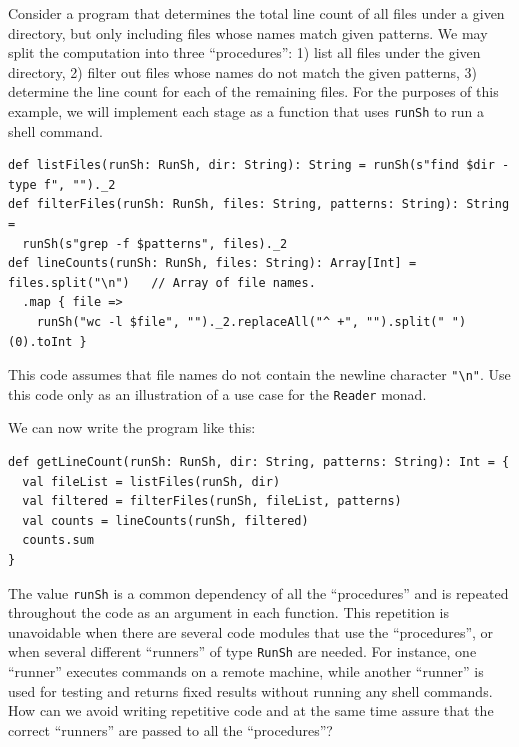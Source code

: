 Consider a program that determines the total line count of all files
under a given directory, but only including files whose names match
given patterns. We may split the computation into three \textsf{``}procedures\textsf{''}:
1) list all files under the given directory, 2) filter out files whose
names do not match the given patterns, 3) determine the line count
for each of the remaining files. For the purposes of this example,
we will implement each stage as a function that uses \lstinline!runSh!
to run a shell command.
\begin{lstlisting}
def listFiles(runSh: RunSh, dir: String): String = runSh(s"find $dir -type f", "")._2
def filterFiles(runSh: RunSh, files: String, patterns: String): String =
  runSh(s"grep -f $patterns", files)._2
def lineCounts(runSh: RunSh, files: String): Array[Int] = files.split("\n")   // Array of file names.
  .map { file =>
    runSh("wc -l $file", "")._2.replaceAll("^ +", "").split(" ")(0).toInt }
\end{lstlisting}
This code assumes that file names do not contain the newline character
\lstinline!"\n"!. Use this code only as an illustration of a use
case for the \lstinline!Reader! monad.

We can now write the program like this:
\begin{lstlisting}
def getLineCount(runSh: RunSh, dir: String, patterns: String): Int = {
  val fileList = listFiles(runSh, dir)
  val filtered = filterFiles(runSh, fileList, patterns)
  val counts = lineCounts(runSh, filtered)
  counts.sum
}
\end{lstlisting}
The value \lstinline!runSh! is a common dependency of all the \textsf{``}procedures\textsf{''}
and is repeated throughout the code as an argument in each function.
This repetition is unavoidable when there are several code modules
that use the \textsf{``}procedures\textsf{''}, or when several different \textsf{``}runners\textsf{''}
of type \lstinline!RunSh! are needed. For instance, one \textsf{``}runner\textsf{''}
executes commands on a remote machine, while another \textsf{``}runner\textsf{''}
is used for testing and returns fixed results without running any
shell commands. How can we avoid writing repetitive code and at the
same time assure that the correct \textsf{``}runners\textsf{''} are passed to all
the \textsf{``}procedures\textsf{''}?

